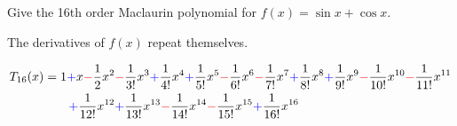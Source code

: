%
%



\subsection*{\Procedural}


\begin{Mquestion}
Give the 16th order Maclaurin polynomial for $f(x)=\sin x+ \cos x$.
\end{Mquestion}
\begin{hint}
The derivatives of $f(x)$ repeat themselves.
\end{hint}
\begin{answer}
\begin{align*}
T_{16}(x)&=1\textcolor{blue}{+}x
\textcolor{red}{-}\frac{1}{2}x^2
\textcolor{red}{-}\frac{1}{3!}x^3
\textcolor{blue}{+}\frac{1}{4!}x^4
\textcolor{blue}{+}\frac{1}{5!}x^5
\textcolor{red}{-}\frac{1}{6!}x^6
\textcolor{red}{-}\frac{1}{7!}x^7
\textcolor{blue}{+}\frac{1}{8!}x^8
\textcolor{blue}{+}\frac{1}{9!}x^9
\textcolor{red}{-}\frac{1}{10!}x^{10}
\textcolor{red}{-}\frac{1}{11!}x^{11}\\
&\qquad\textcolor{blue}{+}\frac{1}{12!}x^{12}
\textcolor{blue}{+}\frac{1}{13!}x^{13}
\textcolor{red}{-}\frac{1}{14!}x^{14}
\textcolor{red}{-}\frac{1}{15!}x^{15}
\textcolor{blue}{+}\frac{1}{16!}x^{16}
\end{align*}
\end{answer}
